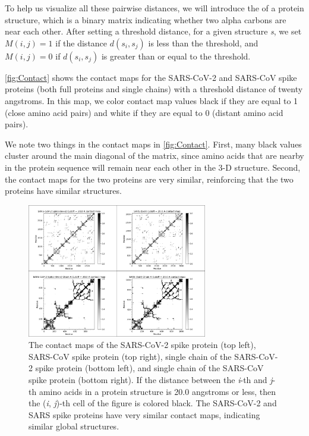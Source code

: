 To help us visualize all these pairwise distances, we will introduce the  of a protein structure, which is a binary matrix indicating whether two alpha carbons are near each other. After setting a threshold distance, for a given structure \textit{s}, we set $M(i, j) = 1$ if the distance $d(s_{i}, s_{j})$ is less than the threshold, and $M(i, j) = 0$ if $d(s_{i}, s_{j})$ is greater than or equal to the threshold.

\autoref{fig:Contact} shows the contact maps for the SARS-CoV-2 and SARS-CoV spike proteins (both full proteins and single chains) with a threshold distance of twenty angstroms. In this map, we color contact map values black if they are equal to 1 (close amino acid pairs) and white if they are equal to 0 (distant amino acid pairs).

We note two things in the contact maps in \autoref{fig:Contact}. First, many black values cluster around the main diagonal of the matrix, since amino acids that are nearby in the protein sequence will remain near each other in the 3-D structure. Second, the contact maps for the two proteins are very similar, reinforcing that the two proteins have similar structures.\\

\begin{note}\end{note}

\begin{figure}[h]
	\centering
	\mySfFamily
	\includegraphics[width = 0.7\textwidth]{../images/Contact.png}
	\caption{The contact maps of the SARS-CoV-2 spike protein (top left), SARS-CoV spike protein (top right), single chain of the SARS-CoV-2 spike protein (bottom left), and single chain of the SARS-CoV spike protein (bottom right). If the distance between the \textit{i}-th and \textit{j}-th amino acids in a protein structure is 20.0 angstroms or less, then the (\textit{i}, \textit{j})-th cell of the figure is colored black. The SARS-CoV-2 and SARS spike proteins have very similar contact maps, indicating similar global structures.}
	\label{fig:Contact}
\end{figure}

